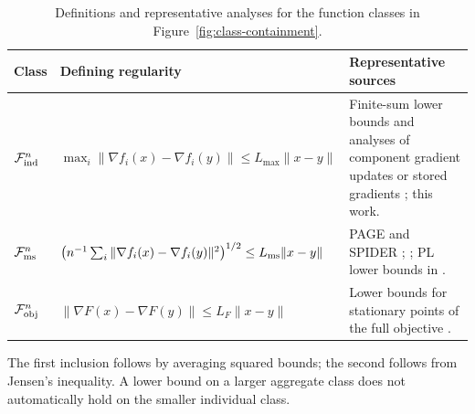 \documentclass{article}
\theoremstyle{definition}
\begin{document}
\begin{table}[H]
\caption{Definitions and representative analyses for the function classes in
Figure~\ref{fig:class-containment}.}
\label{tab:function-classes}
\centering
\footnotesize
\setlength{\tabcolsep}{3.5pt}
\renewcommand{\arraystretch}{1.1}
\begin{tabularx}{\textwidth}{@{}>{\raggedright\arraybackslash}p{}>{\raggedright\arraybackslash}p{}>{\raggedright\arraybackslash}X@{}}
\toprule
\textbf{Class} & \textbf{Defining regularity} & \textbf{Representative sources} \\
\midrule
$\mathcal F_{\rm ind}^n$
& $\max_i\|\nabla f_i(x)-\nabla f_i(y)\|\le L_{\max}\|x-y\|$
& Finite-sum lower bounds and analyses of component gradient updates or stored gradients
  \citep{zhou2019lower,han2024lower,emmenegger2022oracle,defazio2014saga,kavis2022adaspider}; this work. \\
$\mathcal F_{\rm ms}^n$
& $\bigl(n^{-1}\sum_i\|\nabla f_i(x)-\nabla f_i(y)\|^2\bigr)^{1/2}\le L_{\rm ms}\|x-y\|$
& PAGE and SPIDER \citep{fang2018spider,li2021page}; \citet[Definition~3.2]{zhou2019lower}; PL lower bounds in \citet{bai2024complexity}. \\
$\mathcal F_{\rm obj}^n$
& $\|\nabla F(x)-\nabla F(y)\|\le L_F\|x-y\|$
& Lower bounds for stationary points of the full objective \citep{carmon2020lower1,carmon2021lower2}. \\
\bottomrule
\end{tabularx}
\parbox{\textwidth}{\vspace{2pt}\footnotesize
The first inclusion follows by averaging squared bounds; the second follows from Jensen's inequality.  A lower bound on a larger aggregate class does not automatically hold on the smaller individual class.}
\end{table}
\end{document}
